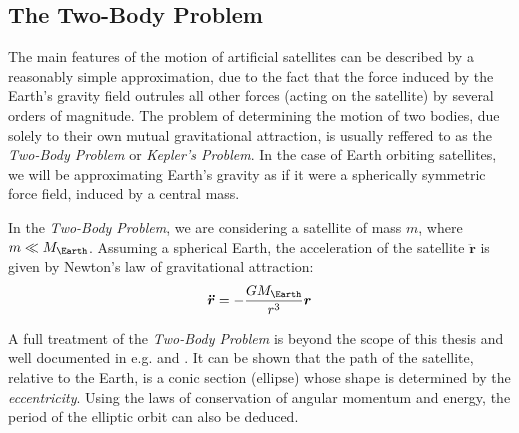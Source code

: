 \subsection{The Two-Body Problem}
\label{ssec:two-body-problem}

The main features of the motion of artificial satellites can be described by a 
reasonably simple approximation, due to the fact that the force induced by the 
Earth's gravity field outrules all other forces (acting on the satellite) by 
several orders of magnitude. The problem of determining the motion of two 
bodies, due solely to their own mutual gravitational attraction, is usually 
reffered to as the \emph{Two-Body Problem} or \emph{Kepler's Problem}. In the 
case of Earth orbiting satellites, we will be approximating Earth's gravity as 
if it were a spherically symmetric force field, induced by a central mass.

In the \emph{Two-Body Problem}, we are considering a satellite of mass $m$, 
where $m \ll M_{\Earth}$. Assuming a spherical Earth, the acceleration of the 
satellite $\bm{\ddot{r}}$ is given by Newton's law of gravitational attraction:
\begin{equation}
  \label{eq:mont32}
  \bm{\ddot{r}} = - \frac{G M_{\Earth}}{r^3} \bm{r}
\end{equation}

A full treatment of the \emph{Two-Body Problem} is beyond the scope of this 
thesis and well documented in e.g. \cite{curtisb} and \cite{chobotov}. It can 
be shown that the path of the satellite, relative to the Earth, is a conic section 
(ellipse) whose shape is determined by the \emph{eccentricity}. Using the laws 
of conservation of angular momentum and energy, the period of the elliptic orbit 
can also be deduced.

\iffalse
